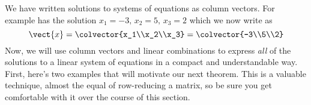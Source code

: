 %
%
We have written solutions to systems of equations as column vectors.  For example  has the solution  $x_1 = -3,\,x_2 = 5,\,x_3 = 2$ which we now write as
%
\begin{equation*}
\vect{x}=\colvector{x_1\\x_2\\x_3}=\colvector{-3\\5\\2}
\end{equation*}
%
Now, we will use column vectors and linear combinations to express {\em all} of the solutions to a linear system of equations in a compact and understandable way.  First, here's two examples that will motivate our next theorem.  This is a valuable technique, almost the equal of row-reducing a matrix, so be sure you get comfortable with it over the course of this section.
%
